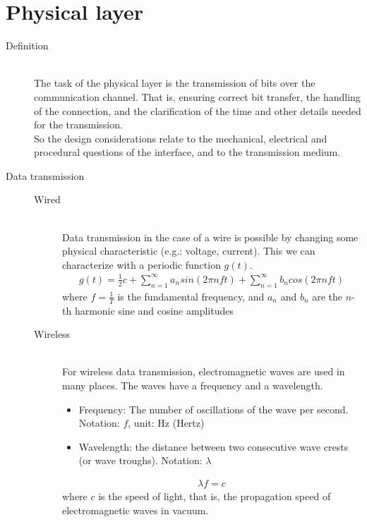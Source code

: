 \documentclass[margin=0px]{article}
\begin{document}
\section{Physical layer}
\begin{description}
    \item[Definition] \hfill \\
        The task of the physical layer is the transmission of bits over the communication channel. That is, ensuring correct bit transfer, the handling of the connection, and the clarification of the time and other details needed for the transmission. \\
        So the design considerations relate to the mechanical, electrical and procedural questions of the interface, and to the transmission medium.
    \item[Data transmission] \hfill
        \begin{description}
            \item[Wired] \hfill \\
                Data transmission in the case of a wire is possible by changing some physical characteristic (e.g.: voltage, current). This we can characterize with a periodic function $g(t)$.
                \begin{align*}
                    g(t) = \frac{1}{2}c+ \sum\limits_{n=1}^\infty a_nsin(2\pi n f t) + \sum\limits_{n=1}^\infty b_ncos(2\pi n f t)
                \end{align*}
                where $f=\frac{1}{T}$ is the fundamental frequency, and $a_n$ and $b_n$ are the $n$-th harmonic sine and cosine amplitudes
            \item[Wireless] \hfill \\
                For wireless data transmission, electromagnetic waves are used in many places. The waves have a frequency and a wavelength.
                \begin{itemize}
                    \item Frequency:
                          The number of oscillations of the wave per second. Notation: $f$, unit: Hz (Hertz)
                    \item Wavelength: the distance between two consecutive wave crests (or wave troughs). Notation: $\lambda$
                \end{itemize}
                \begin{align*}
                    \lambda f = c
                \end{align*}
                where $c$ is the speed of light, that is, the propagation speed of electromagnetic waves in vacuum.

\end{description}
\end{description}
\end{document}
